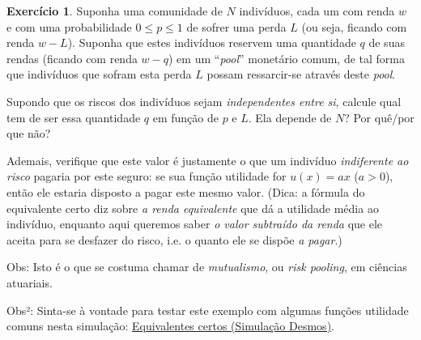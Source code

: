 \documentclass[12pt]{article}
\numberwithin{equation}{section}
\theoremstyle{plain}
\theoremstyle{definition}
\newtheorem{exercise}{Exercício}
\theoremstyle{remark}
\begin{document}
\begin{exercise}
\parencite[, p. 230-1]{Varian2014} Suponha uma comunidade de \(N\)
indivíduos, cada um com renda \(w\) e com uma probabilidade
\(0\leq p \leq 1\) de sofrer uma perda \(L\) (ou seja, ficando com renda
\(w-L\)). Suponha que estes indivíduos reservem uma quantidade \(q\) de suas
rendas (ficando com renda \(w-q\)) em um ``\textit{pool}'' monetário comum, de tal
forma que indivíduos que sofram esta perda $L$ possam ressarcir-se através
deste \textit{pool}.

Supondo que os riscos dos indivíduos sejam \textit{independentes entre
si}, calcule qual tem de ser essa quantidade \(q\) em função de \(p\) e
\(L\). Ela depende de \(N\)? Por quê/por que não?

Ademais, verifique que este valor é justamente o que um indivíduo
\textit{indiferente ao risco} pagaria por este seguro: se sua função
utilidade for \(u(x) = ax\) (\(a>0\)), então ele estaria disposto a pagar este mesmo valor. (Dica: a fórmula do equivalente certo diz sobre \textit{a renda equivalente} que dá a utilidade média ao indivíduo, enquanto aqui queremos saber \textit{o valor subtraído da renda} que ele aceita para se desfazer do risco, i.e. o quanto ele se dispõe \textit{a pagar}.)

Obs: Isto é o que se costuma chamar de \textit{mutualismo}, ou
\textit{risk pooling}, em ciências atuariais.

Obs²: Sinta-se à vontade para testar este exemplo com algumas funções
utilidade comuns nesta simulação:
\href{https://www.desmos.com/calculator/quce5bk5v5}{Equivalentes certos
(Simulação Desmos)}.
\end{exercise}
\end{document}
